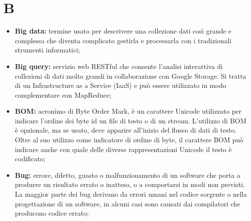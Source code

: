 \section*{B} %
\label{sec:b}
	\begin{itemize}
		\item \textbf{Big data:} termine usato per descrivere una collezione dati così grande e complessa che diventa complicato gestirla e processarla con i tradizionali strumenti informatici;
		\item \textbf{Big query:} servizio web RESTful che consente l'analisi interattiva di collezioni di dati molto grandi in collaborazione con Google Storage. Si tratta di un Infrastructure as a Service (IaaS) e può essere utilizzato in modo complementare con MapReduce;
		\item \textbf{BOM:} acronimo di Byte Order Mark, è un carattere Unicode utilizzato per indicare l'ordine dei byte id un file di testo o di un stream. L'utilizzo di BOM è opzionale, ma se usato, deve apparire all'inizio del flusso di dati di testo. Oltre al suo utilizzo come indicatore di ordine di byte, il carattere BOM può indicare anche con quale delle diverse rappresentazioni Unicode il testo è codificato;
		\item \textbf{Bug:} errore, difetto, guasto o malfunzionamento di un software che porta a produrre un risultato errato o inatteso, o a comportarsi in modi non previsti. La maggior parte dei bug derivano da errori umani nel codice sorgente o nella progettazione di un software, in alcuni casi sono causati dai compilatori che producono codice errato;
	\end{itemize}
\pagebreak

